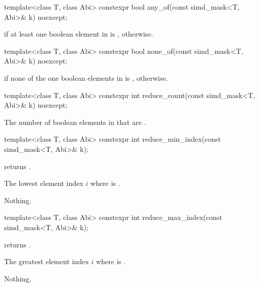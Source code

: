 \begin{itemdecl}
template<class T, class Abi> constexpr bool any_of(const simd_mask<T, Abi>& k) noexcept;
\end{itemdecl}

\begin{itemdescr}
  \pnum\returns
   if at least one boolean element in  is ,  otherwise.
\end{itemdescr}

\begin{itemdecl}
template<class T, class Abi> constexpr bool none_of(const simd_mask<T, Abi>& k) noexcept;
\end{itemdecl}

\begin{itemdescr}
  \pnum\returns
   if none of the one boolean elements in  is ,  otherwise.
\end{itemdescr}

\begin{itemdecl}
template<class T, class Abi> constexpr int reduce_count(const simd_mask<T, Abi>& k) noexcept;
\end{itemdecl}

\begin{itemdescr}
  \pnum\returns
  The number of boolean elements in  that are .
\end{itemdescr}

\begin{itemdecl}
template<class T, class Abi> constexpr int reduce_min_index(const simd_mask<T, Abi>& k);
\end{itemdecl}

\begin{itemdescr}
  \pnum\requires
   returns .

  \pnum\returns
  The lowest element index $i$ where  is .

  \pnum\throws Nothing.
\end{itemdescr}

\begin{itemdecl}
template<class T, class Abi> constexpr int reduce_max_index(const simd_mask<T, Abi>& k);
\end{itemdecl}

\begin{itemdescr}
  \pnum\requires
   returns .

  \pnum\returns
  The greatest element index $i$ where  is .

  \pnum\throws Nothing.
\end{itemdescr}

